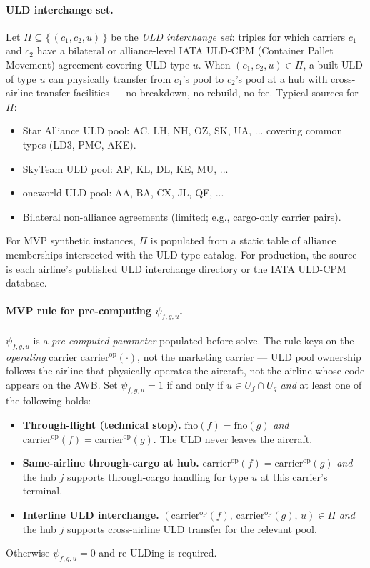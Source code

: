 \documentclass[11pt,a4paper]{article}
\theoremstyle{definition}
\begin{document}
\paragraph{ULD interchange set.}
Let \(\Pi \subseteq \{\, (c_1, c_2, u) \,\}\) be the \emph{ULD interchange set}: triples
for which carriers \(c_1\) and \(c_2\) have a bilateral or alliance-level IATA ULD-CPM
(Container Pallet Movement) agreement covering ULD type \(u\). When
\((c_1, c_2, u) \in \Pi\), a built ULD of type \(u\) can physically transfer from \(c_1\)'s
pool to \(c_2\)'s pool at a hub with cross-airline transfer facilities --- no breakdown,
no rebuild, no fee. Typical sources for \(\Pi\):
\begin{itemize}[noitemsep]
  \item Star Alliance ULD pool: AC, LH, NH, OZ, SK, UA, ... covering common types (LD3, PMC, AKE).
  \item SkyTeam ULD pool: AF, KL, DL, KE, MU, ...
  \item oneworld ULD pool: AA, BA, CX, JL, QF, ...
  \item Bilateral non-alliance agreements (limited; e.g., cargo-only carrier pairs).
\end{itemize}
For MVP synthetic instances, \(\Pi\) is populated from a static table of alliance
memberships intersected with the ULD type catalog. For production, the source is each
airline's published ULD interchange directory or the IATA ULD-CPM database.

\paragraph{MVP rule for pre-computing $\psi_{f,g,u}$.}
$\psi_{f,g,u}$ is a \emph{pre-computed parameter} populated before solve. The rule keys
on the \emph{operating} carrier $\text{carrier}^{\text{op}}(\cdot)$, not the marketing
carrier --- ULD pool ownership follows the airline that physically operates the aircraft,
not the airline whose code appears on the AWB. Set $\psi_{f,g,u} = 1$ if and only if
$u \in U_f \cap U_g$ \emph{and} at least one of the following holds:
\begin{itemize}[noitemsep]
  \item[(a)] \textbf{Through-flight (technical stop).} $\text{fno}(f) = \text{fno}(g)$ \emph{and}
        $\text{carrier}^{\text{op}}(f) = \text{carrier}^{\text{op}}(g)$. The ULD never
        leaves the aircraft.
  \item[(b)] \textbf{Same-airline through-cargo at hub.}
        $\text{carrier}^{\text{op}}(f) = \text{carrier}^{\text{op}}(g)$ \emph{and} the hub
        $j$ supports through-cargo handling for type $u$ at this carrier's terminal.
  \item[(c)] \textbf{Interline ULD interchange.}
        $(\text{carrier}^{\text{op}}(f),\,\text{carrier}^{\text{op}}(g),\,u) \in \Pi$
        \emph{and} the hub $j$ supports cross-airline ULD transfer for the relevant pool.
\end{itemize}
Otherwise $\psi_{f,g,u} = 0$ and re-ULDing is required.
\end{document}
